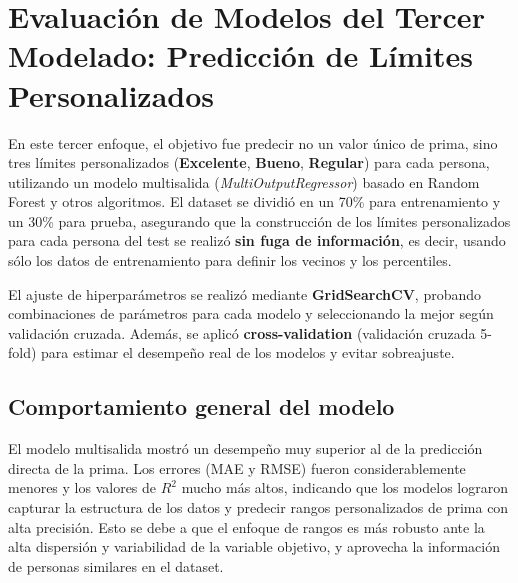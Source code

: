 \documentclass[12pt]{article}
\begin{document}
\section{Evaluación de Modelos del Tercer Modelado: Predicción de Límites Personalizados}

En este tercer enfoque, el objetivo fue predecir no un valor único de prima, sino tres límites personalizados (\textbf{Excelente}, \textbf{Bueno}, \textbf{Regular}) para cada persona, utilizando un modelo multisalida (\textit{MultiOutputRegressor}) basado en Random Forest y otros algoritmos. El dataset se dividió en un 70\% para entrenamiento y un 30\% para prueba, asegurando que la construcción de los límites personalizados para cada persona del test se realizó \textbf{sin fuga de información}, es decir, usando sólo los datos de entrenamiento para definir los vecinos y los percentiles.

El ajuste de hiperparámetros se realizó mediante \textbf{GridSearchCV}, probando combinaciones de parámetros para cada modelo y seleccionando la mejor según validación cruzada. Además, se aplicó \textbf{cross-validation} (validación cruzada 5-fold) para estimar el desempeño real de los modelos y evitar sobreajuste.

\subsection*{Comportamiento general del modelo}
El modelo multisalida mostró un desempeño muy superior al de la predicción directa de la prima. Los errores (MAE y RMSE) fueron considerablemente menores y los valores de $R^2$ mucho más altos, indicando que los modelos lograron capturar la estructura de los datos y predecir rangos personalizados de prima con alta precisión. Esto se debe a que el enfoque de rangos es más robusto ante la alta dispersión y variabilidad de la variable objetivo, y aprovecha la información de personas similares en el dataset.
\end{document}
